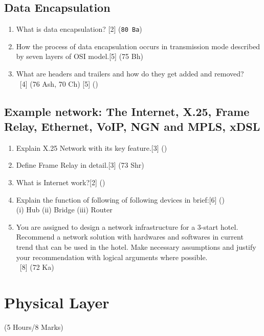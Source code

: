 \documentclass[12pt]{article}
\newcommand{\enter}{\\\textcolor{white}{1}}
\begin{document}
		\subsection{Data Encapsulation}
		\begin{enumerate}[noitemsep, topsep = 0pt]
			\item What is data encapsulation? \hfill [2] (\texttt{80 Ba})
			
			\item How the process of data encapsulation occurs in transmission mode described by seven layers of OSI model.\hfill[5] (75 Bh)

			\item What are headers and trailers and how do they get added and removed?
		\enter\hfill[4] (76 Ash, 70 Ch) [5] () 
		\end{enumerate}

		\subsection{Example network: The Internet, X.25, Frame Relay, Ethernet, VoIP, NGN and MPLS, xDSL}
		\begin{enumerate}[noitemsep, topsep = 0pt]
			\item Explain X.25 Network with its key feature.\hfill[3] ()

			\item Define Frame Relay in detail.\hfill[3] (73 Shr)

			\item What is Internet work?\hfill[2] ()

			\item Explain the function of following of following devices in brief:\hfill[6] ()\\
			(i) Hub (ii) Bridge (iii) Router
			
			\item You are assigned to design a network infrastructure for a 3-start hotel. Recommend a network solution with hardwares and softwares in current trend that can be used in the hotel. Make necessary assumptions and justify your recommendation with logical arguments where possible.
			\enter\hfill[8] (72 Ka)
		\end{enumerate}

	\pagebreak

\section{Physical Layer}
	\begin{center}(5 Hours/8 Marks)\end{center}
\end{document}

